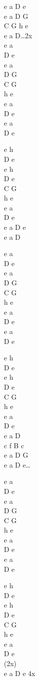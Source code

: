 \begin{chord}
    \begin{tinyTwelve}
    e a D e\\
    e a D G\\
    C G h e\\
    e a D…2x\\
    e a\\
    D e\\
    e a\\
    D G\\
    C G\\
    h e\\
    e a\\
    D e\\
    e a\\
    D e

    e h\\
    D e\\
    e h\\
    D e\\
    C G\\
    h e\\
    e a\\
    D e\\
    e a D e\\
    e a D

    e a\\
    D e\\
    e a\\
    D G\\
    C G\\
    h e\\
    e a\\
    D e\\
    e a\\
    D e

    e h\\
    D e\\
    e h\\
    D e\\
    C G\\
    h e\\
    e a\\
    D e\\
    e a D\\
    c f B c\\
    e a D G \\
    e a D e…

e a\\
D e\\
e a\\
D G\\
C G\\
h e\\
e a\\
D e\\
e a\\
D e

e h\\
D e\\
e h\\
D e\\
C G\\
h e\\
e a\\
D e\\
(2x)\\
e a D e 4x
\end{tinyTwelve}
\end{chord}
